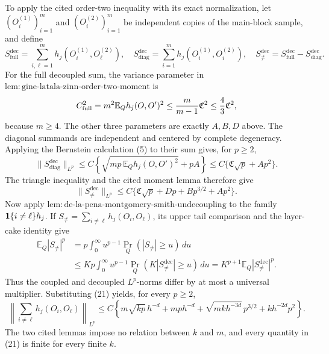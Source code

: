 To apply the cited order-two inequality with its exact normalization, let \((O_i^{(1)})_{i=1}^m\) and \((O_i^{(2)})_{i=1}^m\) be independent copies of the main-block sample, and define
\[
 S_{\mathrm{full}}^{\mathrm{dec}}
 =\sum_{i,\ell=1}^m h_j(O_i^{(1)},O_\ell^{(2)}),
 \quad
 S_{\mathrm{diag}}^{\mathrm{dec}}
 =\sum_{i=1}^m h_j(O_i^{(1)},O_i^{(2)}),
 \quad
 S_{\ne}^{\mathrm{dec}}
 =S_{\mathrm{full}}^{\mathrm{dec}}-S_{\mathrm{diag}}^{\mathrm{dec}}.
\]
For the full decoupled sum, the variance parameter in \(\mathrm{lem{:}gine\text{-}latala\text{-}zinn\text{-}order\text{-}two\text{-}moment}\) is
\[
 C_{\mathrm{full}}^2=m^2\mathbb E_Qh_j(O,O')^2
 \le {m\over m-1}\mathfrak C^2\le {4\over3}\mathfrak C^2,
\]
because \(m\ge4\).  The other three parameters are exactly \(A,B,D\) above.  The diagonal summands are independent and centered by complete degeneracy.  Applying the Bernstein calculation (5) to their sum gives, for \(p\ge2\),
\[
 \|S_{\mathrm{diag}}^{\mathrm{dec}}\|_{L^p}
 \le C\left\{\sqrt{mp\,\mathbb E_Qh_j(O,O')^2}+pA\right\}
 \le C\{\mathfrak C\sqrt p+Ap^2\}.
\]
The triangle inequality and the cited moment lemma therefore give
\[
 \|S_{\ne}^{\mathrm{dec}}\|_{L^p}
 \le C\{\mathfrak C\sqrt p+Dp+Bp^{3/2}+Ap^2\}.
\]
Now apply \(\mathrm{lem{:}de\text{-}la\text{-}pena\text{-}montgomery\text{-}smith\text{-}undecoupling}\) to the family \({\bf1}\{i\ne\ell\}h_j\).  If \(S_{\ne}=\sum_{i\ne\ell}h_j(O_i,O_\ell)\), its upper tail comparison and the layer-cake identity give
\[
 \begin{aligned}
 \mathbb E_Q|S_{\ne}|^p
 &=p\int_0^\infty u^{p-1}\Pr_Q(|S_{\ne}|\ge u)\,du\\
 &\le Kp\int_0^\infty u^{p-1}
       \Pr_Q(K|S_{\ne}^{\mathrm{dec}}|\ge u)\,du
 =K^{p+1}\mathbb E_Q|S_{\ne}^{\mathrm{dec}}|^p.
 \end{aligned}
\]
Thus the coupled and decoupled \(L^p\)-norms differ by at most a universal multiplier.  Substituting (21) yields, for every \(p\ge2\),
\[
 \left\|\sum_{i\ne\ell}h_j(O_i,O_\ell)\right\|_{L^p}
 \le C\left\{m\sqrt{kp}\,h^{-d}+mp h^{-d}
 +\sqrt{mk h^{-3d}}\,p^{3/2}+kh^{-2d}p^2\right\}.
\tag{22}
\]
The two cited lemmas impose no relation between \(k\) and \(m\), and every quantity in (21) is finite for every finite \(k\).

